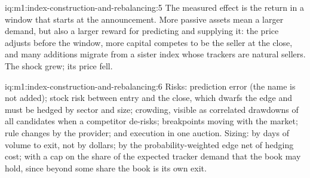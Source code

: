 \begin{solution}{iq:m1:index-construction-and-rebalancing:5}
The measured effect is the return in a window that starts at the
announcement. More passive assets mean a larger demand, but also a larger
reward for predicting and supplying it: the price adjusts before the window,
more capital competes to be the seller at the close, and many additions
migrate from a sister index whose trackers are natural sellers. The shock
grew; its price fell.
\end{solution}

\begin{solution}{iq:m1:index-construction-and-rebalancing:6}
Risks: prediction error (the name is not added); stock risk between entry and
the close, which dwarfs the edge and must be hedged by sector and size;
crowding, visible as correlated drawdowns of all candidates when a
competitor de-risks; breakpoints moving with the market; rule changes by the
provider; and execution in one auction. Sizing: by days of volume to exit,
not by dollars; by the probability-weighted edge net of hedging cost; with a
cap on the share of the expected tracker demand that the book may hold, since
beyond some share the book is its own exit.
\end{solution}
